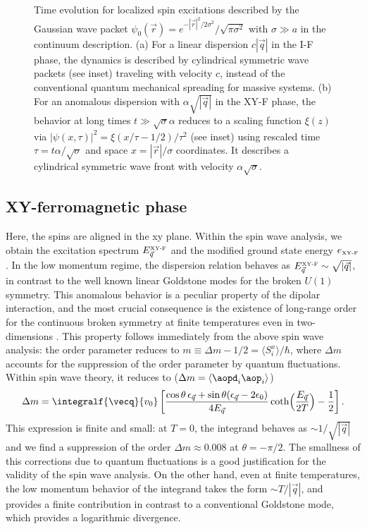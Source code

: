 \begin{figure}[ht]
    \centering
    \caption{ Time evolution for localized spin excitations described by the Gaussian wave packet $\psi_{0}({\vec r}) = e^{- |{\vec r}|^2/2\sigma^2}/\sqrt{\pi \sigma^2}$
  with $\sigma \gg a$ in the continuum description. (a) For a linear dispersion $c|{\vec q}|$ in the I-F phase, the dynamics is described by cylindrical symmetric wave packets (see inset) traveling
  with velocity $c$, instead of the conventional quantum mechanical spreading for massive systems.
  (b) For an anomalous dispersion with $\alpha \sqrt{|{\vec q}|}$ in the XY-F phase, the behavior at long times $t\gg\sqrt{\sigma} \alpha$ reduces to a
  scaling function $\xi(z)$ via $|\psi(x,\tau)|^2 = \xi(x/\tau -1/2)/\tau^2$ (see inset) using rescaled
  time $\tau = t \alpha /\sqrt{\sigma}$ and space $x = |{\vec r}|/\sigma$ coordinates. It describes a cylindrical symmetric wave front with velocity
  $\alpha \sqrt{\sigma}$.}
\end{figure}




\subsection{XY-ferromagnetic phase}
Here, the spins are aligned in the xy plane.
 Within the spin wave analysis, we obtain the excitation spectrum
 $ E^{\mbox{\tiny{XY-F}}}_{\vec q}$ and the modified ground state energy
 $e_{\mbox{\tiny{XY-F}}}$.
In the low momentum regime, the dispersion relation behaves as $ E^{\mbox{\tiny XY-F}}_{\vec q} \sim \sqrt{|{\vec q}|}$, in contrast to the well
known linear Goldstone modes for the broken $U(1)$ symmetry.
This anomalous behavior is a peculiar property of the dipolar interaction, and the most crucial consequence
is the existence of long-range order for the continuous broken symmetry at finite temperatures
even in two-dimensions \cite{Bruno2001}.
This property follows immediately from the above spin wave analysis:
the order parameter reduces to $m \equiv \Delta m - 1/2=\langle S_{i}^{x}\rangle/\hbar $, where $\Delta m$ accounts for
the suppression of the order parameter by quantum fluctuations. Within spin wave theory, it reduces to ($\Delta m = \langle \aopd_i \aop_i\rangle$)
%
\begin{align}
    \Delta m = \integralf{\vecq}{v_0} \left[\frac{\cos \theta \, \epsilon_{\vec q} +\sin \theta ( \epsilon_{\vec q}-2 \epsilon_{0})}{4 E_{\vec q} } \coth\!\Big(\frac{E_{\vec q}}{2T}\Big) - \frac{1}{2}\right] .
\end{align}
%
This expression is finite and small: at $T=0$, the integrand behaves as $\sim 1/\sqrt{|{\vec q}|}$ and we find a
suppression of the order $\Delta m \approx 0.008$ at $\theta= - \pi/2 $. The smallness of this corrections due to
quantum fluctuations is a good justification for the validity of the spin wave analysis. On the other hand,
even at finite temperatures, the low momentum behavior of the integrand takes the form $\sim T/|{\vec q}|$,
and provides a finite contribution in contrast to a conventional Goldstone mode, which provides a logarithmic divergence.


